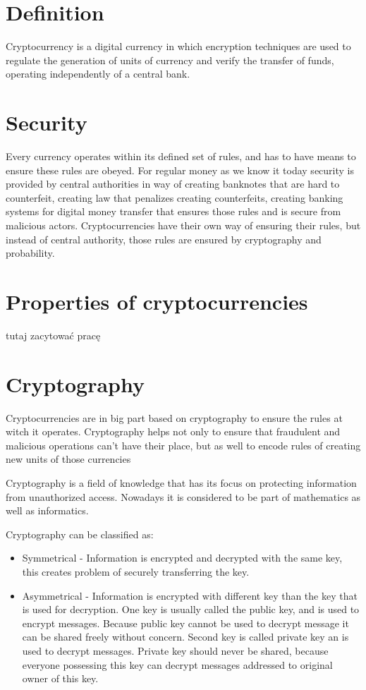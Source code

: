 \documentclass[12pt, en, eng, oneside]{mgr}
\begin{document}
\section{Definition}
Cryptocurrency is a digital currency in which encryption techniques are used to regulate the generation of units of currency and verify the transfer of funds, operating independently of a central bank. \cite{crypto-def}

\section{Security}
Every currency operates within its defined set of rules, and has to have means to ensure these rules are obeyed. For regular money as we know it today security is provided by central authorities in way of creating banknotes that are hard to counterfeit, creating law that penalizes creating counterfeits, creating banking systems for digital money transfer that ensures those rules and is secure from malicious actors. Cryptocurrencies have their own way of ensuring their rules, but instead of central authority, those rules are ensured by cryptography and probability.

\section{Properties of cryptocurrencies}
tutaj zacytować pracę

\section{Cryptography}
Cryptocurrencies are in big part based on cryptography to ensure the rules at witch it operates. Cryptography helps not only to ensure that fraudulent and malicious operations can't have their place, but as well to encode rules of creating new units of those currencies 

Cryptography is a field of knowledge that has its focus on protecting information from unauthorized access. Nowadays it is considered to be part of mathematics as well as informatics. 

Cryptography can be classified as:

\begin{itemize}
\item
Symmetrical - Information is encrypted and decrypted with the same key, this creates problem of securely transferring the key.
\item
Asymmetrical - Information is encrypted with different key than the key that is used for decryption. One key is usually called the public key, and is used to encrypt messages. Because public key cannot be used to decrypt message it can be shared freely without concern. Second key is called private key an is used to decrypt messages. Private key should never be shared, because everyone possessing this key can decrypt messages addressed to original owner of this key.
\end{itemize} 
\end{document}
